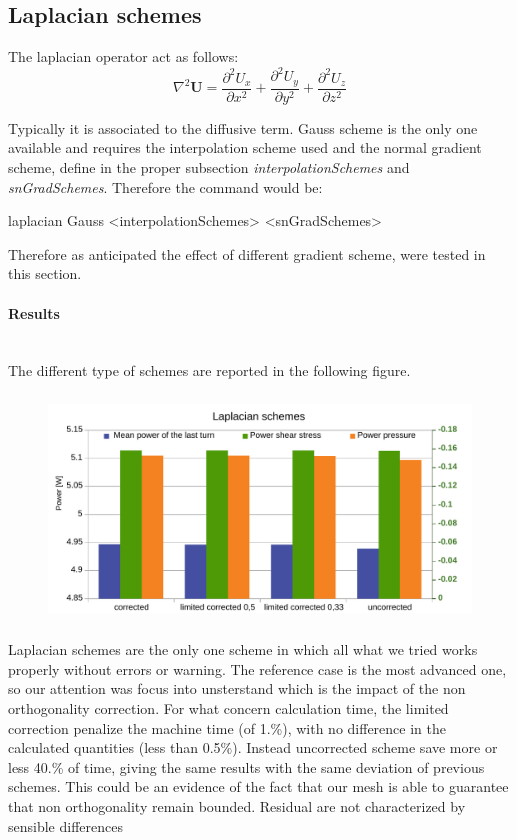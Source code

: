 \documentclass[a4paper,12pt]{article}
\begin{document}
\subsection{Laplacian schemes}
The laplacian operator act as follows:
\begin{equation}
\nabla^2 \bm{U} = \frac{\partial^2 U_x}{\partial x^2}+ \frac{\partial^2 U_y}{\partial y^2} + \frac{\partial^2 U_z}{\partial z^2}
\end{equation}

Typically it is associated to the diffusive term. Gauss scheme is the only one available and requires the interpolation scheme used and the normal gradient scheme, define in the proper subsection \textit{interpolationSchemes} and \textit{snGradSchemes}. Therefore the command would be:

\begin{center}
{\ttfamily laplacian	Gauss	<interpolationSchemes>		<snGradSchemes>}
\end{center}

Therefore as anticipated the effect of different gradient scheme, were tested in this section.

\paragraph{Results} \mbox{}\\
The different type of schemes are reported in the following figure.
\begin{figure}[H]
\centering
\includegraphics[height=6cm]{images/schemes/laplacianschems-results.pdf}
\end{figure}

Laplacian schemes are the only one scheme in which all what we tried works properly without errors or warning. The reference case is the most advanced one, so our attention was focus into unsterstand which is the impact of the non orthogonality correction. For what concern calculation time, the limited correction penalize the machine time (of 1.\%), with no difference in the calculated quantities (less than 0.5\%). Instead uncorrected scheme save more or less 40.\% of time, giving the same results with the same deviation of previous schemes. This could be an evidence of the fact that our mesh is able to guarantee that non orthogonality remain bounded. Residual are not characterized by sensible differences
\end{document}
